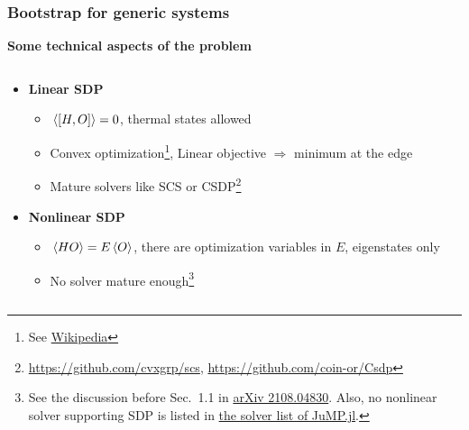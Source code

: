 \documentclass{beamer}
\newcommand{\concept}[1]{\textbf{#1}}
\begin{document}
\begin{frame}
\frametitle{Bootstrap for generic systems}

\textbf{Some technical aspects of the problem}

\begin{columns}
    \begin{column}{0.6\textwidth}
        \begin{itemize}
            \item \concept{Linear SDP} 
            \begin{itemize}
                \item $\expval*{\comm{H}{O}} = 0$, thermal states allowed
                \item Convex optimization\footnote[frame]{See \href{https://en.wikipedia.org/wiki/Semidefinite_programming}{Wikipedia}}, Linear objective $\Rightarrow$ minimum at the edge
                \item Mature solvers like SCS or CSDP\footnote[frame]{\href{https://github.com/cvxgrp/scs}{https://github.com/cvxgrp/scs}, \href{https://github.com/coin-or/Csdp}{https://github.com/coin-or/Csdp}}
            \end{itemize}
            \item \concept{Nonlinear SDP} 
            \begin{itemize}
                \item $\expval*{{H}{O}} = E \expval*{O}$, there are optimization variables in $E$, eigenstates only
                \item No solver mature enough\footnote[frame]{See the discussion before Sec.~1.1 in \href{https://arxiv.org/abs/2108.04830}{arXiv 2108.04830}. Also, no nonlinear solver supporting SDP is listed in \href{https://jump.dev/JuMP.jl/stable/installation/}{the solver list of JuMP.jl}.}
            \end{itemize}
        \end{itemize} 
    \end{column}
    \begin{column}{0.4\textwidth}

\end{column}
\end{columns}
\end{frame}
\end{document}
